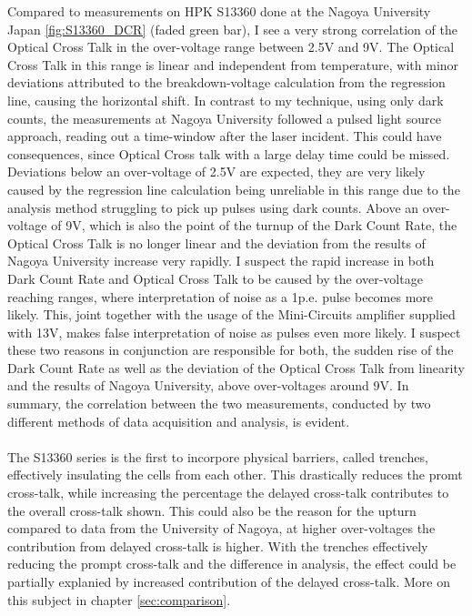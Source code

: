 \documentclass[12pt,article,type=msc,colorback,accentcolor=tud9c]{tudthesis}
\begin{document}
Compared to measurements on HPK S13360 done at the Nagoya University Japan \ref{fig:S13360_DCR} (faded green bar), I see a very strong correlation of the Optical Cross Talk in the over-voltage range between 2.5V and 9V. The Optical Cross Talk in this range is linear and independent from temperature, with minor deviations attributed to the breakdown-voltage calculation from the regression line, causing the horizontal shift. In contrast to my technique, using only dark counts, the measurements at Nagoya University followed a pulsed light source approach, reading out a time-window after the laser incident. This could have consequences, since Optical Cross talk with a large delay time could be missed. Deviations below an over-voltage of 2.5V are expected, they are very likely caused by the regression line calculation being unreliable in this range due to the analysis method struggling to pick up pulses using dark counts. Above an over-voltage of 9V, which is also the point of the turnup of the Dark Count Rate, the Optical Cross Talk is no longer linear and the deviation from the results of Nagoya University increase very rapidly. I suspect the rapid increase in both Dark Count Rate and Optical Cross Talk to be caused by the over-voltage reaching ranges, where interpretation of noise as a 1p.e. pulse becomes more likely. This, joint together with the usage of the Mini-Circuits amplifier supplied with 13V, makes false interpretation of noise as pulses even more likely. I suspect these two reasons in conjunction are responsible for both, the sudden rise of the Dark Count Rate as well as the deviation of the Optical Cross Talk from linearity and the results of Nagoya University, above over-voltages around 9V. In summary, the correlation between the two measurements, conducted by two different methods of data acquisition and analysis, is evident.\\\\

The S13360 series is the first to incorpore physical barriers, called trenches, effectively insulating the cells from each other. This drastically reduces the promt cross-talk, while increasing the percentage the delayed cross-talk contributes to the overall cross-talk shown. This could also be the reason for the upturn compared to data from the University of Nagoya, at higher over-voltages the contribution from delayed cross-talk is higher. With the trenches effectively reducing the prompt cross-talk and the difference in analysis, the effect could be partially explanied by increased contribution of the delayed cross-talk. More on this subject in chapter {\ref{sec:comparison}}.
\end{document}
